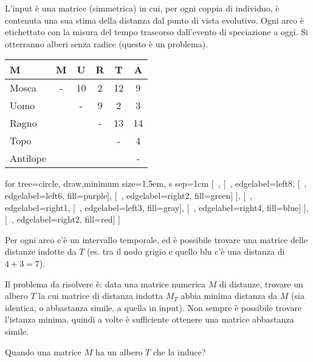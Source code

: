 L'input è una matrice (simmetrica) in cui, per ogni coppia di individuo, è contenuta una sua stima della distanza dal punto di vista evolutivo. Ogni arco è etichettato con la misura del tempo trascorso dall'evento di speciazione a oggi. Si otterranno alberi senza radice (questo è un problema).

\begin{example}{}{}
	\begin{center}
	\begin{tabular}{l | *{5}{c}}
		M		& M & U & R & T & A \\ \hline
		Mosca	& - & 10 & 2 & 12 & 9 \\
		Uomo	& ~ & - & 9 & 2 & 3 \\
		Ragno	& ~ & ~ & - & 13 & 14 \\
		Topo	& ~ & ~ & ~ & - & 4 \\
		Antilope & ~ & ~ & ~ & ~ & -
	\end{tabular}

	\begin{forest}
		for tree={circle, draw,minimum size=1.5em, s sep=1cm}
		[~,
			[~, edgelabel={left}{8},
				[~, edgelabel={left}{6}, fill=purple],
				[~, edgelabel={right}{2}, fill=green]
			],
			[~, edgelabel={right}{1},
				[~, edgelabel={left}{3}, fill=gray],
				[~, edgelabel={right}{4}, fill=blue]
			],
			[~, edgelabel={right}{2}, fill=red]
		]
	\end{forest}
	\end{center}
\end{example}

Per ogni arco c'è un intervallo temporale, ed è possibile trovare una matrice delle distanze indotte da $T$ (es. tra il nodo grigio e quello blu c'è una distanza di $4 + 3 = 7$). 

Il problema da risolvere è: data una matrice numerica $M$ di distanze, trovare un albero $T$ la cui matrice di distanza indotta $M_T$ abbia minima distanza da $M$ (sia identica, o abbastanza simile, a quella in input). Non sempre è possibile trovare l'istanza minima, quindi a volte è sufficiente ottenere una matrice abbastanza simile.

Quando una matrice $M$ ha un albero $T$ che la induce?

